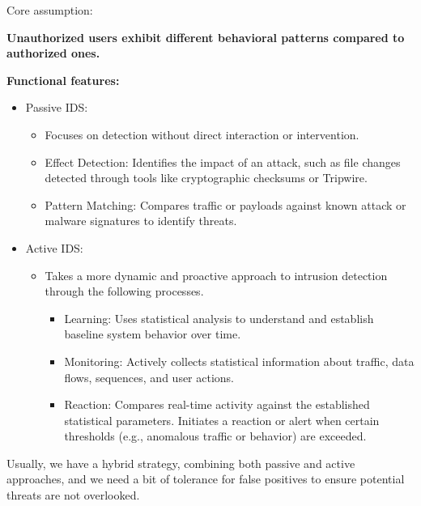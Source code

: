 \hfill

\begin{multicols}{2}
    Core assumption:

    \columnbreak

    \raggedleft
    \textbf{Unauthorized users exhibit different behavioral patterns compared to authorized ones.}
\end{multicols}

\textbf{Functional features:}
\begin{itemize}
    \item Passive IDS:
    \begin{itemize}
        \item Focuses on detection without direct interaction or intervention.
        \item Effect Detection: Identifies the impact of an attack, such as file changes detected through tools like cryptographic checksums or Tripwire.
        \item Pattern Matching: Compares traffic or payloads against known attack or malware signatures to identify threats.
    \end{itemize}
    \item Active IDS:
    \begin{itemize}
        \item Takes a more dynamic and proactive approach to intrusion detection through the following processes.
        \begin{itemize}
            \item Learning: Uses statistical analysis to understand and establish baseline system behavior over time.
            \item Monitoring: Actively collects statistical information about traffic, data flows, sequences, and user actions.
            \item Reaction: Compares real-time activity against the established statistical parameters. Initiates a reaction or alert when certain thresholds (e.g., anomalous traffic or behavior) are exceeded.
        \end{itemize}
    \end{itemize}
\end{itemize}

\begin{tcolorbox}[colback=blue!10!white, colframe=blue!50!white]
    Usually, we have a hybrid strategy, combining both passive and active approaches, and we need a bit of tolerance for false positives to ensure potential threats are not overlooked.
\end{tcolorbox}

